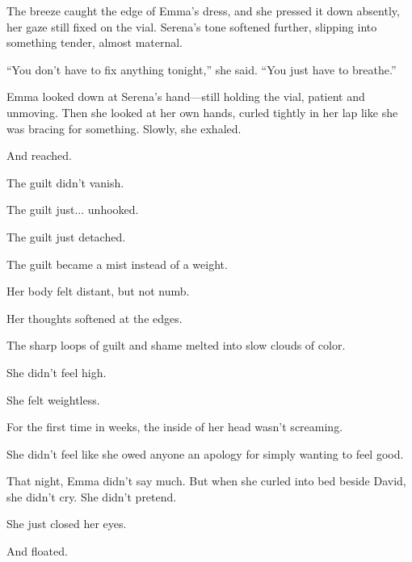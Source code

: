 The breeze caught the edge of Emma’s dress, and she pressed it down absently, her gaze still fixed 
on the vial. Serena’s tone softened further, slipping into something tender, almost maternal.

``You don’t have to fix anything tonight,'' she said. ``You just have to breathe.''

Emma looked down at Serena’s hand—still holding the vial, patient and unmoving. Then she looked at 
her own hands, curled tightly in her lap like she was bracing for something. Slowly, she exhaled.

And reached.

The guilt didn’t vanish. 

The guilt just... unhooked. 

The guilt just detached. 

The guilt became a mist instead of a weight. 

Her body felt distant, but not numb. 

Her thoughts softened at the edges. 

The sharp loops of guilt and shame melted into slow clouds of color.

She didn’t feel high.

She felt weightless.

For the first time in weeks, the inside of her head wasn’t screaming.

She didn’t feel like she owed anyone an apology for simply wanting to feel good.

That night, Emma didn’t say much. But when she curled into bed beside David, she didn’t cry.
She didn’t pretend.

She just closed her eyes.

And floated.


